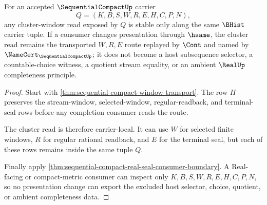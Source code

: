 \begin{theorem}
\label{thm:sequentialcompact-cluster-carrier-stability}
For an accepted $\SequentialCompactUp$ carrier
$$
Q=(K,B,S,W,R,E,H,C,P,N),
$$
any cluster-window read exposed by $Q$ is stable only along the same $\BHist$ carrier tuple. If a consumer changes presentation through $\hsame$, the cluster read remains the transported $W,R,E$ route replayed by $\Cont$ and named by $\NameCert_{\SequentialCompactUp}$; it does not become a host subsequence selector, a countable-choice witness, a quotient stream equality, or an ambient $\RealUp$ completeness principle.
\end{theorem}
\begin{proof}
Start with \autoref{thm:sequential-compact-window-transport}. The row $H$ preserves the stream-window, selected-window, regular-readback, and terminal-seal rows before any completion consumer reads the route.

The cluster read is therefore carrier-local. It can use $W$ for selected finite windows, $R$ for regular rational readback, and $E$ for the terminal seal, but each of these rows remains inside the same tuple $Q$.

Finally apply \autoref{thm:sequential-compact-real-seal-consumer-boundary}. A Real-facing or compact-metric consumer can inspect only $K,B,S,W,R,E,H,C,P,N$, so no presentation change can export the excluded host selector, choice, quotient, or ambient completeness data.
\end{proof}


